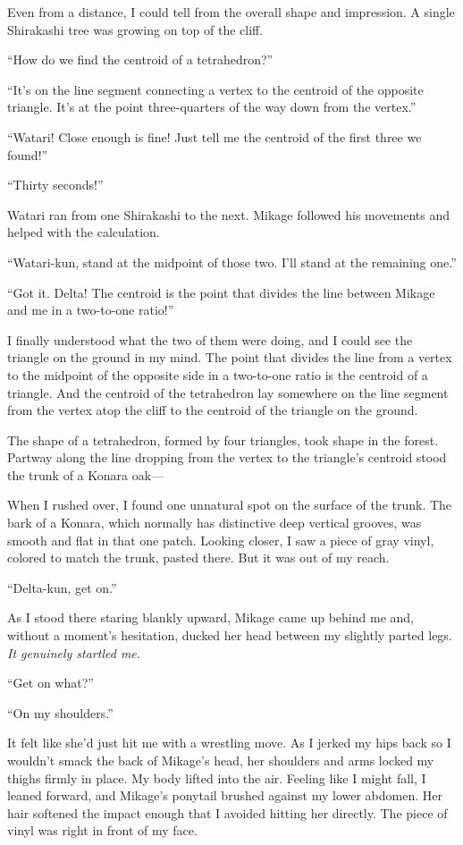 \documentclass[
    a4paper,
    12pt,
    twoside,
    openany,
    UTF8,
    fontset=windows
]{ctexbook}
\begin{document}
Even from a distance, I could tell from the overall shape and impression. A single Shirakashi tree was growing on top of the cliff.

``How do we find the centroid of a tetrahedron?''

``It's on the line segment connecting a vertex to the centroid of the opposite triangle. It's at the point three-quarters of the way down from the vertex.''

``Watari! Close enough is fine! Just tell me the centroid of the first three we found!''

``Thirty seconds!''

Watari ran from one Shirakashi to the next. Mikage followed his movements and helped with the calculation.

``Watari-kun, stand at the midpoint of those two. I'll stand at the remaining one.''

``Got it. Delta! The centroid is the point that divides the line between Mikage and me in a two-to-one ratio!''

I finally understood what the two of them were doing, and I could see the triangle on the ground in my mind. The point that divides the line from a vertex to the midpoint of the opposite side in a two-to-one ratio is the centroid of a triangle. And the centroid of the tetrahedron lay somewhere on the line segment from the vertex atop the cliff to the centroid of the triangle on the ground.

The shape of a tetrahedron, formed by four triangles, took shape in the forest. Partway along the line dropping from the vertex to the triangle's centroid stood the trunk of a Konara oak---

When I rushed over, I found one unnatural spot on the surface of the trunk. The bark of a Konara, which normally has distinctive deep vertical grooves, was smooth and flat in that one patch. Looking closer, I saw a piece of gray vinyl, colored to match the trunk, pasted there. But it was out of my reach.

``Delta-kun, get on.''

As I stood there staring blankly upward, Mikage came up behind me and, without a moment's hesitation, ducked her head between my slightly parted legs. \textit{It genuinely startled me.}

``Get on what?''

``On my shoulders.''

It felt like she'd just hit me with a wrestling move. As I jerked my hips back so I wouldn't smack the back of Mikage's head, her shoulders and arms locked my thighs firmly in place. My body lifted into the air. Feeling like I might fall, I leaned forward, and Mikage's ponytail brushed against my lower abdomen. Her hair softened the impact enough that I avoided hitting her directly. The piece of vinyl was right in front of my face.
\end{document}
